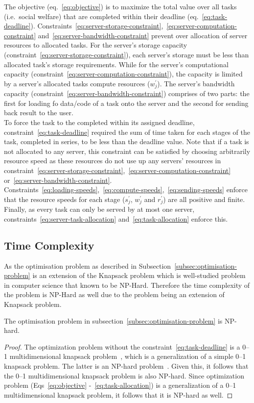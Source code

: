 The objective (eq.~\ref{eq:objective}) is to maximize the total value over all tasks (i.e.\ social welfare) that
are completed within their deadline (eq.~\ref{eq:task-deadline}).
Constraints~\ref{eq:server-storage-constraint},~\ref{eq:server-computation-constraint}
and~\ref{eq:server-bandwidth-constraint} prevent over allocation of server resources to allocated tasks.
For the server's storage capacity (constraint~\ref{eq:server-storage-constraint}), each server's storage must be less
than allocated task's storage requirements. While for the server's computational capacity
(constraint~\ref{eq:server-computation-constraint}), the capacity is limited by a server's allocated tasks
compute resources ($w^{'}_j$). The server's bandwidth capacity (constraint~\ref{eq:server-bandwidth-constraint})
comprises of two parts: the first for loading fo data/code of a task onto the server and the second for sending
back result to the user. \\
To force the task to the completed within its assigned deadline, constraint~\ref{eq:task-deadline} required the sum
of time taken for each stages of the task, completed in series, to be less than the deadline value.
Note that if a task is not allocated to any server, this constraint can be satisfied by choosing arbitrarily
resource speed as these resources do not use up any servers' resources in
constraint~\ref{eq:server-storage-constraint},~\ref{eq:server-computation-constraint}
or~\ref{eq:server-bandwidth-constraint}. \\
Constraints~\ref{eq:loading-speeds},~\ref{eq:compute-speeds},~\ref{eq:sending-speeds} enforce that the resource
speeds for each stage ($s^{'}_j$, $w^{'}_j$ and $r^{'}_j$) are all positive and finite.
Finally, as every task can only be served by at most one server, constraints~\ref{eq:server-task-allocation}
and~\ref{eq:task-allocation} enforce this.

\subsection{Time Complexity}
\label{subsec:time-complexity}
As the optimisation problem as described in Subsection~\ref{subsec:optimisation-problem} is an extension of the
Knapsack problem which is well-studied problem in computer science that known to be NP-Hard.
Therefore the time complexity of the problem is NP-Hard as well due to the problem being an extension of 
Knapsack problem. 
\begin{theorem}
    The optimisation problem in subsection~\ref{subsec:optimisation-problem} is NP-hard.
\end{theorem}
\begin{proof}
    The optimization problem without the constraint~\ref{eq:task-deadline} is a 0--1 multidimensional knapsack
    problem~\cite{knapsackproblems_2004}, which is a generalization of a simple 0--1 knapsack problem. The latter is an
    NP-hard problem~\cite{knapsackproblems_2004}. Given this, it follows that the 0--1 multidimensional knapsack problem
    is also NP-hard. Since optimization problem (Eqs~\ref{eq:objective} -~\ref{eq:task-allocation}) is a
    generalization of a 0--1 multidimensional knapsack problem, it follows that it is NP-hard as well.
\end{proof}

